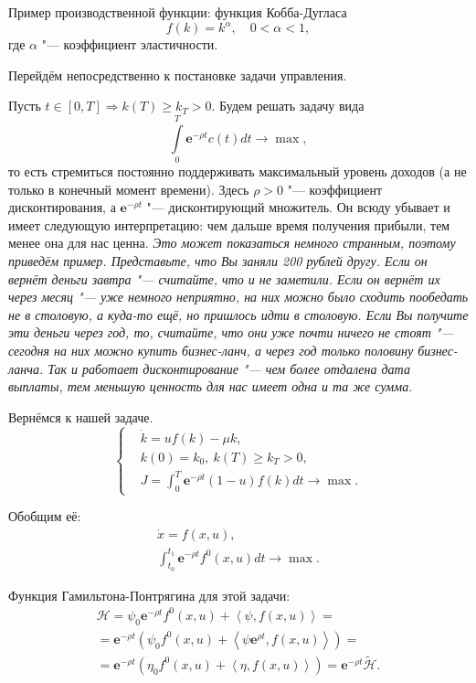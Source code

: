 \documentclass[12pt, a4paper]{article}
\theoremstyle{rusdef}
\newcommand{\e}{\mathbf{e}}
\renewcommand{\H}{\mathcal{H}} %
\DeclareMathOperator*{\thus}{\Rightarrow} %
\begin{document}
Пример производственной функции: функция Кобба-Дугласа
\[f(k) = k^{\alpha}, \quad 0 < \alpha < 1,\]
где $\alpha$ "--- коэффициент эластичности.

Перейдём непосредственно к постановке задачи управления.

Пусть $t \in [0, T] \thus k(T) \geqslant k_T > 0$. Будем решать задачу вида
\[
  \int\limits_{0}^{T} \e^{-\rho t} c(t) dt \to \max,
\]
то есть стремиться постоянно поддерживать максимальный уровень доходов (а не только в конечный момент времени). Здесь $\rho > 0$ "--- коэффициент дисконтирования, а $\e^{-\rho t}$ "--- дисконтирующий множитель. Он всюду убывает и имеет следующую интерпретацию: чем дальше время получения прибыли, тем менее она для нас ценна. \textit{Это может показаться немного странным, поэтому приведём пример. Представьте, что Вы заняли 200 рублей другу. Если он вернёт деньги завтра "--- считайте, что и не заметили. Если он вернёт их через месяц "--- уже немного неприятно, на них можно было сходить пообедать не в столовую, а куда-то ещё, но пришлось идти в столовую. Если Вы получите эти деньги через год, то, считайте, что они уже почти ничего не стоят "--- сегодня на них можно купить бизнес-ланч, а через год только половину бизнес-ланча. Так и работает дисконтирование "--- чем более отдалена дата выплаты, тем меньшую ценность для нас имеет одна и та же сумма}.

Вернёмся к нашей задаче.
\[
  \left\{
    \begin{aligned}
      &\dot{k} = uf(k) - \mu k, \\
      &k(0) = k_0, \: k(T) \geqslant k_T > 0, \\
      &J = \int_0^T \e^{-\rho t} (1-u)f(k) dt \to \max.
    \end{aligned}
  \right.
\]

Обобщим её:
\begin{gather*}
  \dot{x} = f(x, u), \\
  \int_{t_0}^{t_1} \e^{-\rho t} f^0(x, u) dt \to \max.
\end{gather*}


Функция Гамильтона-Понтрягина для этой задачи:
\begin{multline*}
  \H = \psi_0 \e^{-\rho t}f^0(x,u) + \left<\psi, f(x,u) \right> = \\ = \e^{-\rho t} \left( \psi_0 f^0(x,u) + \left< \psi \e^{\rho t}, f(x,u) \right> \right) = \\ = \e^{-\rho t} \left( \eta_0 f^0(x,u) + \left< \eta, f(x,u) \right> \right) = \e^{-\rho t} \tilde{\H}.
\end{multline*}
\end{document}
